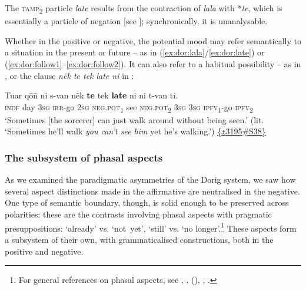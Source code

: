\documentclass[output=paper,colorlinks,citecolor=brown,draft]{langscibook}
\begin{document}
\noindent The \textsc{tamp}\textsubscript{2} particle \textit{late} results from the contraction of \textit{lala} with *\textit{te}, which is essentially a particle of negation [see ]; synchronically, it is unanalysable. 

Whether in the positive or negative, the potential mood may refer semantically to a situation in the present or future – as in (\ref{ex:dor:lala}/\ref{ex:dor:late}) or (\ref{ex:dor:follow1}--\ref{ex:dor:follow2}). It can also refer to a habitual possibility – as in , or the clause \textit{nēk {te} tek {late} ni} in :


\ea\label{ex:dor:sorcerer}
    \gll  Tuar qō\={n} ni s-van nēk \textbf{te} tek \textbf{late} ni ni t-van ti.\\ 
          \textsc{indf} day \textsc{\textsc{3sg}} \textsc{irr}-go {\db}\textsc{\textsc{2sg}} \textsc{neg.pot\textsubscript{1}} see \textsc{neg.pot\textsubscript{2}} \textsc{\textsc{3sg}} \textsc{\textsc{3sg}} \textsc{ipfv\textsubscript{1}}-go \textsc{ipfv\textsubscript{2}}\\
    \glt ‘Sometimes [the sorcerer] can just walk around without being seen.’ \newline 
(lit. ‘Sometimes he’ll walk \textit{you can’t see him} yet he’s walking.’)  \href{https://doi.org/10.24397/pangloss-0003195#S38}{\{\texttt{⚓}3195\#S38\}} 
\z 

\subsubsection{The subsystem of phasal aspects}\label{sec:dor:2.1.7}

As we examined the paradigmatic asymmetries of the Dorig system, we saw how several aspect distinctions made in the affirmative are neutralised in the negative. One type of semantic boundary, though, is solid enough to be preserved across polarities: these are the contrasts involving phasal aspects with pragmatic presuppositions: ‘already’ vs. ‘not~yet’, ‘still’ vs. ‘no longer’.\footnote{For general references on phasal aspects, see \citet{Löbner1989}, \citet{Auwera1993}, (\citeyear{Auwera1998}), \citet{Baar1997}, \citet{Krifka2000}.} These aspects form a subsystem of their own, with grammaticalised constructions, both in the positive and negative.
\end{document}
